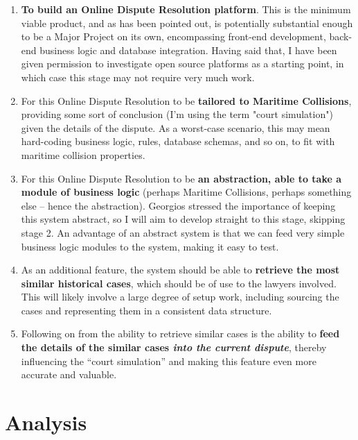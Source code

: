 \begin{enumerate}

    \item \textbf{To build an Online Dispute Resolution platform}. This is the minimum viable product, and as has been pointed out, is potentially substantial enough to be a Major Project on its own, encompassing front-end development, back-end business logic and database integration. Having said that, I have been given permission to investigate open source platforms as a starting point, in which case this stage may not require very much work.
    
    \item For this Online Dispute Resolution to be \textbf{tailored to Maritime Collisions}, providing some sort of conclusion (I’m using the term "court simulation") given the details of the dispute. As a worst-case scenario, this may mean hard-coding business logic, rules, database schemas, and so on, to fit with maritime collision properties.

    \item For this Online Dispute Resolution to be \textbf{an abstraction, able to take a module of business logic} (perhaps Maritime Collisions, perhaps something else – hence the abstraction). Georgios stressed the importance of keeping this system abstract, so I will aim to develop straight to this stage, skipping stage 2. An advantage of an abstract system is that we can feed very simple business logic modules to the system, making it easy to test.

    \item As an additional feature, the system should be able to \textbf{retrieve the most similar historical cases}, which should be of use to the lawyers involved. This will likely involve a large degree of setup work, including sourcing the cases and representing them in a consistent data structure.

    \item Following on from the ability to retrieve similar cases is the ability to \textbf{feed the details of the similar cases \emph{into the current dispute}}, thereby influencing the “court simulation” and making this feature even more accurate and valuable.

\end{enumerate}

\section{Analysis} %

